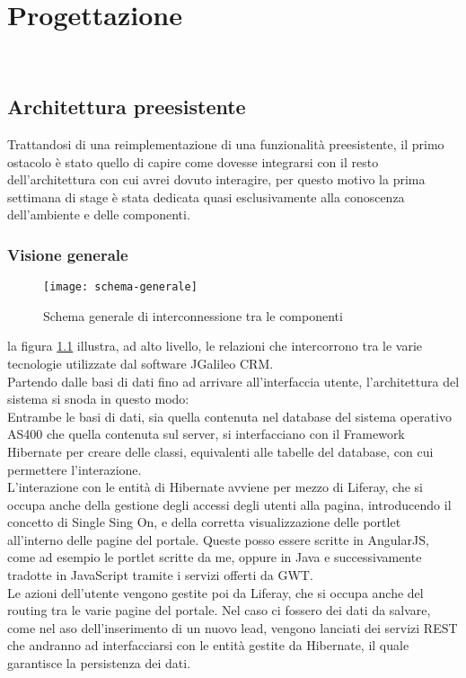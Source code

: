 
\chapter{Progettazione}
\label{cap:progettazione}

\\ %

\section{Architettura preesistente}
Trattandosi di una reimplementazione di una funzionalità preesistente, il primo ostacolo è stato quello di capire come dovesse integrarsi con il resto dell'architettura con cui avrei dovuto interagire, per questo motivo la prima settimana di stage è stata dedicata quasi esclusivamente alla conoscenza dell'ambiente e delle componenti. \\
\subsection{Visione generale}

\begin{figure}[h]
	\centering
	\texttt{[image: schema-generale]}
	\caption{Schema generale di interconnessione tra le componenti}
	\label{schema-generale}
\end{figure}
la figura \ref{schema-generale} illustra, ad alto livello, le relazioni che intercorrono tra le varie tecnologie utilizzate dal software JGalileo CRM.\\
Partendo dalle basi di dati fino ad arrivare all'interfaccia utente, l'architettura del sistema si snoda in questo modo:\\
Entrambe le basi di dati, sia quella contenuta nel database del sistema operativo AS400 che quella contenuta sul server, si interfacciano con il Framework Hibernate per creare delle classi, equivalenti alle tabelle del database, con cui permettere l'interazione.\\
L'interazione con le entità di Hibernate avviene per mezzo di Liferay, che si occupa anche della gestione degli accessi degli utenti alla pagina, introducendo il concetto di Single Sing On, e della corretta visualizzazione delle portlet all'interno delle pagine del portale. Queste posso essere scritte in AngularJS, come ad esempio le portlet scritte da me, oppure in Java e successivamente tradotte in JavaScript tramite i servizi offerti da GWT.\\
Le azioni dell'utente vengono gestite poi da Liferay, che si occupa anche del routing tra le varie pagine del portale. Nel caso ci fossero dei dati da salvare, come nel aso dell'inserimento di un nuovo lead, vengono lanciati dei servizi REST che andranno ad interfacciarsi con le entità gestite da Hibernate, il quale garantisce la persistenza dei dati.
	
